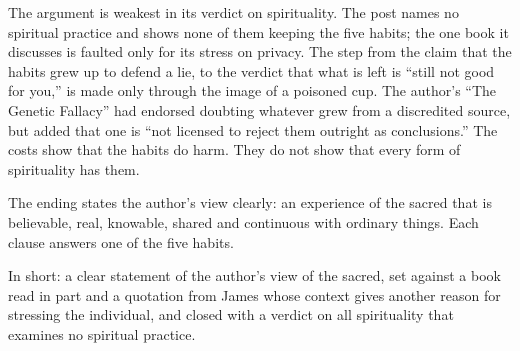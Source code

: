 \begin{afterword}
The argument is weakest in its verdict on spirituality. The post names no spiritual practice and shows none of them keeping the five habits; the one book it discusses is faulted only for its stress on privacy. The step from the claim that the habits grew up to defend a lie, to the verdict that what is left is ``still not good for you,'' is made only through the image of a poisoned cup. The author's ``The Genetic Fallacy'' had endorsed doubting whatever grew from a discredited source, but added that one is ``not licensed to reject them outright as conclusions.'' The costs show that the habits do harm. They do not show that every form of spirituality has them.

The ending states the author's view clearly: an experience of the sacred that is believable, real, knowable, shared and continuous with ordinary things. Each clause answers one of the five habits.

In short: a clear statement of the author's view of the sacred, set against a book read in part and a quotation from James whose context gives another reason for stressing the individual, and closed with a verdict on all spirituality that examines no spiritual practice.
\end{afterword}

